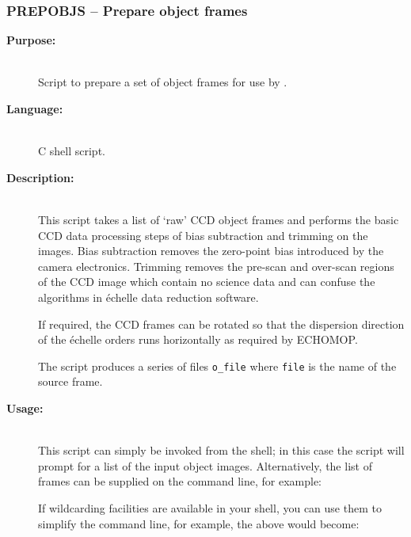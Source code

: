 \documentclass[twoside,11pt]{starlink}
\providecommand{\scspec}[2]{#1}
\begin{document}
\newpage
\subsubsection{\label{se_prepobjs}PREPOBJS
                \scspec{--}{-} Prepare object frames}


\begin{description}

\item [\textbf{Purpose:}] \mbox{} \\
     Script to prepare a set of object frames for use by
     .

\item [\textbf{Language:}] \mbox{} \\
     C shell script.

\item [\textbf{Description:}] \mbox{} \\
     This script takes a list of `raw' CCD object frames and performs
     the basic CCD data processing steps of bias subtraction and trimming
     on the images.  Bias subtraction removes the zero-point bias
     introduced by the camera electronics.  Trimming removes the pre-scan
     and over-scan regions of the CCD image which contain no science data
     and can confuse the algorithms in \'{e}chelle data reduction software.

     If required, the CCD frames can be rotated so that the dispersion
     direction of the \'{e}chelle orders runs horizontally as required by
     ECHOMOP.

     The script produces a series of files \verb+o_file+ where
     \verb+file+ is the name of the source frame.

\item [\textbf{Usage:}] \mbox{} \\
     This script can simply be invoked from the shell; in this case
     the script will prompt for a list of the input object images.
     Alternatively, the list of frames can be supplied on the
     command line, for example:

\begin{terminalv}
\end{terminalv}

     If wildcarding facilities are available in your shell, you can use
     them to simplify the command line, for example, the above would
     become:


\end{description}
\end{document}
